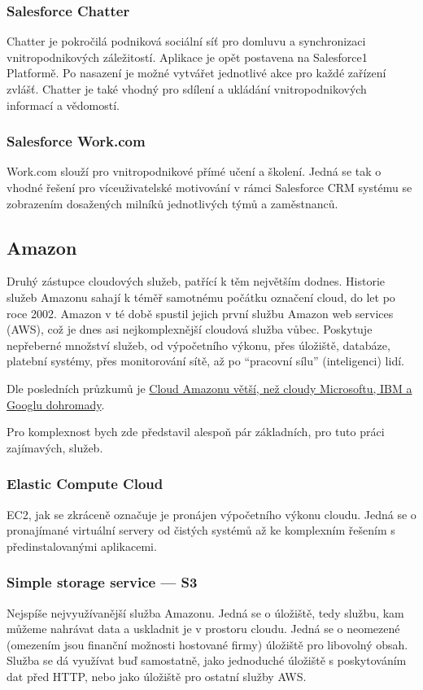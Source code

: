 \subsubsection{Salesforce Chatter}
Chatter je pokročilá podniková sociální síť pro domluvu a synchronizaci vnitropodnikových záležitostí. Aplikace je opět postavena na Salesforce1 Platformě. Po nasazení je možné vytvářet jednotlivé akce pro každé zařízení zvlášť. Chatter je také vhodný pro sdílení a ukládání vnitropodnikových informací a vědomostí.\nocite{salesforce:chatter}

\subsubsection{Salesforce Work.com}
Work.com slouží pro vnitropodnikové přímé učení a školení. Jedná se tak o vhodné řešení pro víceuživatelské motivování v rámci Salesforce CRM systému se zobrazením dosažených milníků jednotlivých týmů a zaměstnanců.\nocite{salesforce:work}

\subsection{Amazon}
Druhý zástupce cloudových služeb, patřící k těm největším dodnes. Historie služeb Amazonu sahají k téměř samotnému počátku označení cloud, do let po roce 2002. Amazon v té době spustil jejich první službu Amazon web services (AWS), což je dnes asi nejkomplexnější cloudová služba vůbec. Poskytuje nepřeberné množství služeb, od výpočetního výkonu, přes úložiště, databáze, platební systémy, přes monitorování sítě, až po "`pracovní sílu"' (inteligenci) lidí.

Dle posledních průzkumů je \href{http://connect.zive.cz/bleskovky/cloud-amazonu-je-vetsi-nez-cloudy-microsoftu-ibm-a-googlu-dohromady/sc-321-a-171477/default.aspx}{Cloud Amazonu větší, než cloudy Microsoftu, IBM a Googlu dohromady\cite{zive:amazonCloud}}.

Pro komplexnost bych zde představil alespoň pár základních, pro tuto práci zajímavých, služeb.

\subsubsection{Elastic Compute Cloud}
EC2, jak se zkráceně označuje je pronájen výpočetního výkonu cloudu. Jedná se o pronajímané virtuální servery od čistých systémů až ke komplexním řešením s předinstalovanými aplikacemi.

\subsubsection{Simple storage service --- S3}
Nejspíše nejvyužívanější služba Amazonu. Jedná se o úložiště, tedy službu, kam můžeme nahrávat data a uskladnit je v prostoru cloudu. Jedná se o neomezené (omezením jsou finanční možnosti hostované firmy) úložiště pro libovolný obsah. Služba se dá využívat buď samostatně, jako jednoduché úložiště s poskytováním dat před HTTP, nebo jako úložiště pro ostatní služby AWS.

